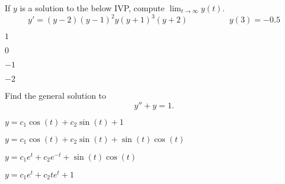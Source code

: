 \begin{readinessAssuranceTest}
\item %
If \(y\) is a solution to the below IVP, compute \(\displaystyle \lim _{t \rightarrow \infty} y(t)\).
\[ y'=(y-2)(y-1)^2y(y+1)^3(y+2) \hspace{5em} y(3)=-0.5\]
\begin{multicols}{4}
\begin{readinessAssuranceTestChoices}
\item \(1\) 
\item \(0\)
\item \(-1\) %
\item \(-2\) 
\end{readinessAssuranceTestChoices}
\end{multicols}
\vfill

\item %
Find the general solution to \[y''+y=1.\]
\begin{multicols}{2}
\begin{readinessAssuranceTestChoices}
\item \(y=c_1\cos(t)+c_2\sin(t)+1\) %
\item \(y=c_1\cos(t)+c_2\sin(t)+\sin(t)\cos(t)\)
\item \(y=c_1e^t+c_2e^{-t}+\sin(t)\cos(t)\)
\item \(y=c_1e^t+c_2te^t+1\)
\end{readinessAssuranceTestChoices}
\end{multicols}
\vfill




\end{readinessAssuranceTest}
